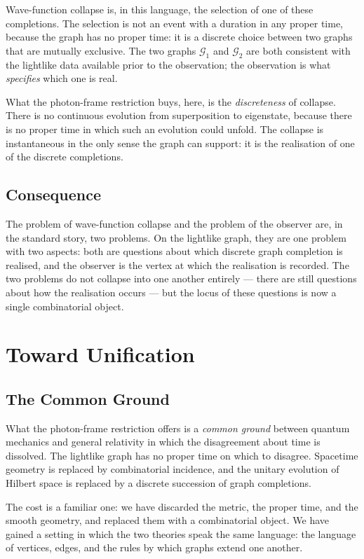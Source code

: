 \documentclass[11pt]{article}
\begin{document}
Wave-function collapse is, in this language, the selection of one of these completions. The selection is not an event with a duration in any proper time, because the graph has no proper time: it is a discrete choice between two graphs that are mutually exclusive. The two graphs $\mathcal{G}_1$ and $\mathcal{G}_2$ are both consistent with the lightlike data available prior to the observation; the observation is what \emph{specifies} which one is real.

What the photon-frame restriction buys, here, is the \emph{discreteness} of collapse. There is no continuous evolution from superposition to eigenstate, because there is no proper time in which such an evolution could unfold. The collapse is instantaneous in the only sense the graph can support: it is the realisation of one of the discrete completions.

\subsection{Consequence}

The problem of wave-function collapse and the problem of the observer are, in the standard story, two problems. On the lightlike graph, they are one problem with two aspects: both are questions about which discrete graph completion is realised, and the observer is the vertex at which the realisation is recorded. The two problems do not collapse into one another entirely --- there are still questions about how the realisation occurs --- but the locus of these questions is now a single combinatorial object.

\section{Toward Unification}
\label{sec:unification}

\subsection{The Common Ground}

What the photon-frame restriction offers is a \emph{common ground} between quantum mechanics and general relativity in which the disagreement about time is dissolved. The lightlike graph has no proper time on which to disagree. Spacetime geometry is replaced by combinatorial incidence, and the unitary evolution of Hilbert space is replaced by a discrete succession of graph completions.

The cost is a familiar one: we have discarded the metric, the proper time, and the smooth geometry, and replaced them with a combinatorial object. We have gained a setting in which the two theories speak the same language: the language of vertices, edges, and the rules by which graphs extend one another.
\end{document}
